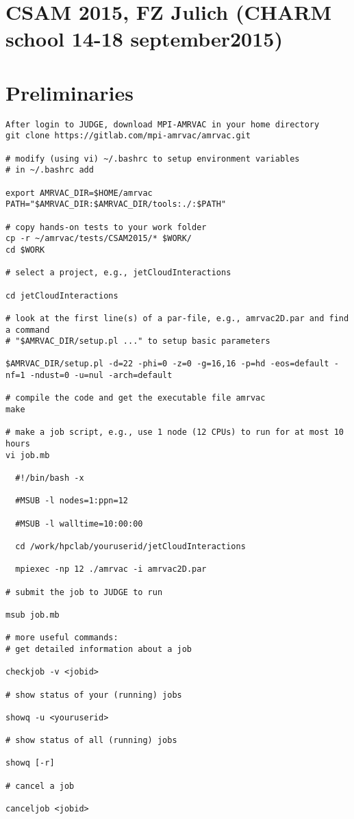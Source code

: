 \documentclass[10pt]{article}
\begin{document}
\section*{CSAM 2015, FZ Julich (CHARM school 14-18 september2015)}
\section*{Preliminaries}
\begin{verbatim}
After login to JUDGE, download MPI-AMRVAC in your home directory
git clone https://gitlab.com/mpi-amrvac/amrvac.git

# modify (using vi) ~/.bashrc to setup environment variables
# in ~/.bashrc add

export AMRVAC_DIR=$HOME/amrvac
PATH="$AMRVAC_DIR:$AMRVAC_DIR/tools:./:$PATH"

# copy hands-on tests to your work folder
cp -r ~/amrvac/tests/CSAM2015/* $WORK/
cd $WORK

# select a project, e.g., jetCloudInteractions

cd jetCloudInteractions

# look at the first line(s) of a par-file, e.g., amrvac2D.par and find a command 
# "$AMRVAC_DIR/setup.pl ..." to setup basic parameters

$AMRVAC_DIR/setup.pl -d=22 -phi=0 -z=0 -g=16,16 -p=hd -eos=default -nf=1 -ndust=0 -u=nul -arch=default

# compile the code and get the executable file amrvac
make

# make a job script, e.g., use 1 node (12 CPUs) to run for at most 10 hours
vi job.mb

  #!/bin/bash -x

  #MSUB -l nodes=1:ppn=12

  #MSUB -l walltime=10:00:00

  cd /work/hpclab/youruserid/jetCloudInteractions

  mpiexec -np 12 ./amrvac -i amrvac2D.par

# submit the job to JUDGE to run

msub job.mb

# more useful commands:
# get detailed information about a job

checkjob -v <jobid>

# show status of your (running) jobs

showq -u <youruserid>

# show status of all (running) jobs

showq [-r]

# cancel a job

canceljob <jobid>

\end{verbatim}
\end{document}

